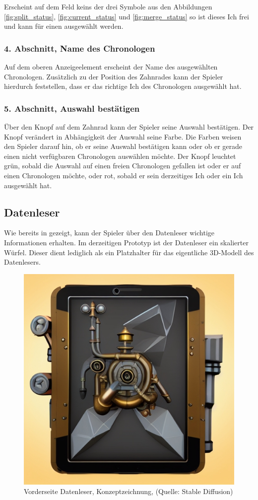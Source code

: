 Erscheint auf dem Feld keins der drei Symbole aus den Abbildungen \ref{fig:split_status}, \ref{fig:current_status} und \ref{fig:merge_status} so ist dieses Ich frei und kann für einen  ausgewählt werden.

\subsubsection{4. Abschnitt, Name des Chronologen}

Auf dem oberen Anzeigeelement erscheint der Name des ausgewählten Chronologen. Zusätzlich zu der Position des Zahnrades kann der Spieler hierdurch feststellen, dass er das richtige Ich des Chronologen ausgewählt hat.

\subsubsection{5. Abschnitt, Auswahl bestätigen}

Über den Knopf auf dem Zahnrad kann der Spieler seine Auswahl bestätigen. Der Knopf verändert in Abhängigkeit der Auswahl seine Farbe. Die Farben weisen den Spieler darauf hin, ob er seine Auswahl bestätigen kann oder ob er gerade einen nicht verfügbaren Chronologen auswählen möchte. Der Knopf leuchtet grün, sobald die Auswahl auf einen freien Chronologen gefallen ist oder er auf einen Chronologen  möchte, oder rot, sobald er sein derzeitiges Ich oder ein  Ich ausgewählt hat.

\subsection{Datenleser}
Wie bereits in  gezeigt, kann der Spieler über den Datenleser wichtige Informationen erhalten. 
Im derzeitigen Prototyp ist der Datenleser ein skalierter Würfel. Dieser dient lediglich als ein Platzhalter für das eigentliche \ac{3D}-Modell des Datenlesers.

\begin{figure}[ht]
\centering
\includegraphics[width=.5\linewidth]{content/pictures/Datenleser_vorderseite.jpg}
\caption{Vorderseite Datenleser, Konzeptzeichnung, (Quelle: Stable Diffusion)}
\label{fig:datenleser_front}
\end{figure}

